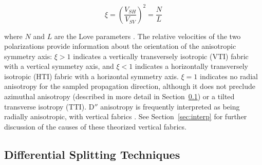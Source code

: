 \documentclass{standard}
\begin{document}
\begin{equation}
    \xi = \left(\frac{V_{SH}}{V_{SV}}\right)^2 = \frac{N}{L}
\end{equation}

\noindent
where $N$ and $L$ are the Love parameters \parencite{skemerInferringUppermantleFlow2016}. The relative velocities of the two polarizations provide information about the orientation of the anisotropic symmetry axis: $\xi > 1$ indicates a vertically transversely isotropic (VTI) fabric with a vertical symmetry axis, and $\xi < 1$ indicates a horizontally transversely isotropic (HTI) fabric with a horizontal symmetry axis. $\xi = 1$ indicates no radial anisotropy for the sampled propagation direction, although it does not preclude azimuthal anisotropy (described in more detail in Section~\ref{sec:diff-split}) or a tilted transverse isotropy (TTI). D$''$ anisotropy is frequently interpreted as being radially anisotropic, with vertical fabrics \parencite{wysessionLateralVariationsCompressional1999,kendallConstraintsSeismicAnisotropy1996}. See Section~\ref{sec:interp} for further discussion of the causes of these theorized vertical fabrics.

\subsection{Differential Splitting Techniques}
\label{sec:diff-split}
\end{document}
